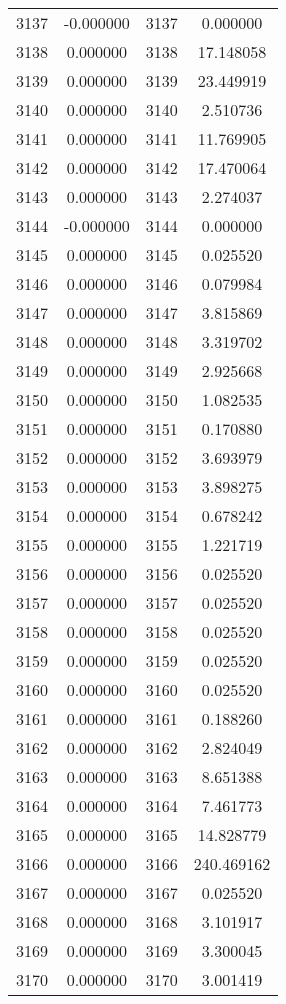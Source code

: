 \documentclass[12pt]{article}
\begin{document}
\begin{longtable}{@{}cccc@{}}
3137 & -0.000000 & 3137 & 0.000000 \\
3138 & 0.000000 & 3138 & 17.148058 \\
3139 & 0.000000 & 3139 & 23.449919 \\
3140 & 0.000000 & 3140 & 2.510736 \\
3141 & 0.000000 & 3141 & 11.769905 \\
3142 & 0.000000 & 3142 & 17.470064 \\
3143 & 0.000000 & 3143 & 2.274037 \\
3144 & -0.000000 & 3144 & 0.000000 \\
3145 & 0.000000 & 3145 & 0.025520 \\
3146 & 0.000000 & 3146 & 0.079984 \\
3147 & 0.000000 & 3147 & 3.815869 \\
3148 & 0.000000 & 3148 & 3.319702 \\
3149 & 0.000000 & 3149 & 2.925668 \\
3150 & 0.000000 & 3150 & 1.082535 \\
3151 & 0.000000 & 3151 & 0.170880 \\
3152 & 0.000000 & 3152 & 3.693979 \\
3153 & 0.000000 & 3153 & 3.898275 \\
3154 & 0.000000 & 3154 & 0.678242 \\
3155 & 0.000000 & 3155 & 1.221719 \\
3156 & 0.000000 & 3156 & 0.025520 \\
3157 & 0.000000 & 3157 & 0.025520 \\
3158 & 0.000000 & 3158 & 0.025520 \\
3159 & 0.000000 & 3159 & 0.025520 \\
3160 & 0.000000 & 3160 & 0.025520 \\
3161 & 0.000000 & 3161 & 0.188260 \\
3162 & 0.000000 & 3162 & 2.824049 \\
3163 & 0.000000 & 3163 & 8.651388 \\
3164 & 0.000000 & 3164 & 7.461773 \\
3165 & 0.000000 & 3165 & 14.828779 \\
3166 & 0.000000 & 3166 & 240.469162 \\
3167 & 0.000000 & 3167 & 0.025520 \\
3168 & 0.000000 & 3168 & 3.101917 \\
3169 & 0.000000 & 3169 & 3.300045 \\
3170 & 0.000000 & 3170 & 3.001419 \\

\end{longtable}
\end{document}

